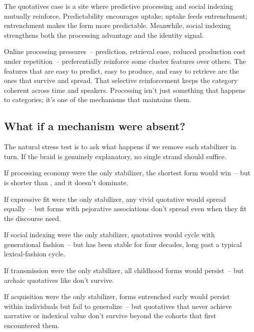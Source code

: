 The quotatives case is a site where predictive processing and social indexing mutually reinforce. Predictability encourages uptake; uptake feeds entrenchment; entrenchment makes the form more predictable. Meanwhile, social indexing strengthens both the processing advantage and the identity signal.

Online processing pressures~-- prediction, retrieval ease, reduced production cost under repetition~-- preferentially reinforce some cluster features over others. The features that are easy to predict, easy to produce, and easy to retrieve are the ones that survive and spread. That selective reinforcement keeps the category coherent across time and speakers. Processing isn't just something that happens to categories; it's one of the mechanisms that maintains them.



\subsection{What if a mechanism were absent?}
\label{sec:6:mechanism-absent}

The natural stress test is to ask what happens if we remove each stabilizer in turn. If the braid is genuinely explanatory, no single strand should suffice.

If processing economy were the only stabilizer, the shortest form would win~-- but  is shorter than , and it doesn't dominate.

If expressive fit were the only stabilizer, any vivid quotative would spread equally~-- but forms with pejorative associations don't spread even when they fit the discourse need.

If social indexing were the only stabilizer, quotatives would cycle with generational fashion~-- but  has been stable for four decades, long past a typical lexical-fashion cycle.

If transmission were the only stabilizer, all childhood forms would persist~-- but archaic quotatives like  don't survive.

If acquisition were the only stabilizer, forms entrenched early would persist within individuals but fail to generalize~-- but quotatives that never achieve narrative or indexical value don't survive beyond the cohorts that first encountered them.

